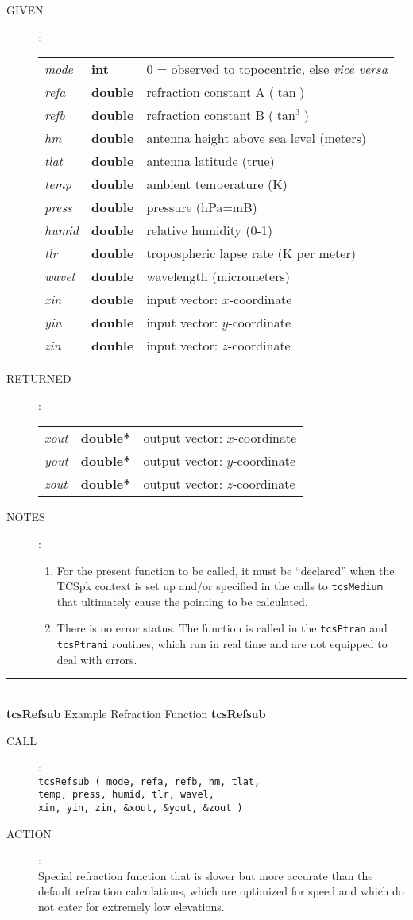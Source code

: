 \documentclass[12pt,fleqn,twoside]{article}
\renewcommand{\_}{{\tt\char'137}}     %
\newcommand{\routine}[2]
{
  \newpage
  \rule{\textwidth}{0.3mm}\\ \nopagebreak
  {\Large {\bf #1} \hfill #2 \hfill {\bf #1}}
  \vspace{-1ex}
}
\newcommand{\call}[1]
{
  \goodbreak
  \begin{description}
    \item[CALL]: \\[0.5ex] \nopagebreak
        {\tt #1}
  \end{description}
  \vspace{-3ex}
}
\newcommand{\action}[1]
{
  \goodbreak
  \begin{description}
    \item[ACTION]: \\[0.5ex] \nopagebreak
        #1
  \end{description}
  \vspace{-3ex}
}
\newcommand{\args}[2]
{
  \goodbreak
  \begin{description}
  \item[#1]: \\[1.5ex] \nopagebreak
    \hspace*{-0.9em}
    \begin{tabular}{p{4.5em}p{5.8em}p{23.5em}}
      #2
    \end{tabular}
  \end{description}
  \vspace{-3ex}
}
\newcommand{\spec}[3]
{
  {\em {#1}} & {\bf \mbox{#2}} & {#3}
}
\newcommand{\notes}[1]
{
  \goodbreak
  \begin{description}
    \item[NOTES]: \nopagebreak
        #1
  \end{description}
  \vspace{-3ex}
}
\begin{document}
\args{GIVEN}
{
\spec{mode}{int}{0 = observed to topocentric, else {\it vice versa}} \\
\spec{refa}{double}{refraction constant A ($\tan$)} \\
\spec{refb}{double}{refraction constant B ($\tan^3$)} \\
\spec{hm}{double}{antenna height above sea level (meters)} \\
\spec{tlat}{double}{antenna latitude (true)} \\
\spec{temp}{double}{ambient temperature (K)} \\
\spec{press}{double}{pressure (hPa=mB)} \\
\spec{humid}{double}{relative humidity (0-1)} \\
\spec{tlr}{double}{tropospheric lapse rate (K per meter)} \\
\spec{wavel}{double}{wavelength (micrometers)} \\
\spec{xin}{double}{input vector: $x$-coordinate} \\
\spec{yin}{double}{input vector: $y$-coordinate} \\
\spec{zin}{double}{input vector: $z$-coordinate}
}
\args{RETURNED}
{
\spec{xout}{double*}{output vector: $x$-coordinate} \\
\spec{yout}{double*}{output vector: $y$-coordinate} \\
\spec{zout}{double*}{output vector: $z$-coordinate}
}
\notes{
\begin{enumerate}
\item For the present function to be called, it must be ``declared''
      when the TCSpk context is set up and/or specified in the calls
      to {\tt tcsMedium} that ultimately cause the pointing to be
      calculated.
\item There is no error status.  The function is called in the
      {\tt tcsPtran} and {\tt tcsPtrani} routines, which run in
      real time and are not equipped to deal with errors.
\end{enumerate}
}
\routine{tcsRefsub}{Example Refraction Function}
\label{tcsRefsub}
\call{tcsRefsub ( mode, refa, refb, hm, tlat, \\
 \hspace*{13.2ex} temp, press, humid, tlr, wavel, \\
 \hspace*{13.2ex} xin, yin, zin, \&xout, \&yout, \&zout ) }
\action{Special refraction function that is slower but more accurate
        than the default
        refraction calculations, which are optimized for speed and which
        do not cater for extremely low elevations.}
\end{document}
